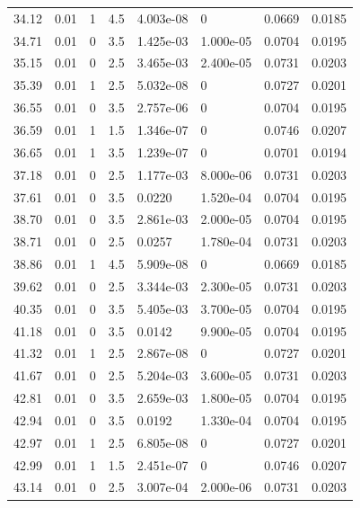 \documentclass[preview]{standalone}
\begin{document}
{{{\begin{tabular}{L{1.2cm}C{1.2cm} C{0.3cm}C{0.5cm} C{1.4cm}C{1.4cm} C{1.4cm}C{1.4cm}}
  34.12  &  0.01  & 1     & 4.5 &  4.003e-08  & 0  & 0.0669 &  0.0185   \\ 
  34.71  &  0.01  & 0     & 3.5 &  1.425e-03  & 1.000e-05  & 0.0704 &  0.0195   \\ 
  35.15  &  0.01  & 0     & 2.5 &  3.465e-03  & 2.400e-05  & 0.0731 &  0.0203   \\ 
  35.39  &  0.01  & 1     & 2.5 &  5.032e-08  & 0  & 0.0727 &  0.0201   \\ 
  36.55  &  0.01  & 0     & 3.5 &  2.757e-06  & 0  & 0.0704 &  0.0195   \\ 
  36.59  &  0.01  & 1     & 1.5 &  1.346e-07  & 0  & 0.0746 &  0.0207   \\ 
  36.65  &  0.01  & 1     & 3.5 &  1.239e-07  & 0  & 0.0701 &  0.0194   \\ 
  37.18  &  0.01  & 0     & 2.5 &  1.177e-03  & 8.000e-06  & 0.0731 &  0.0203   \\ 
  37.61  &  0.01  & 0     & 3.5 &  0.0220  & 1.520e-04  & 0.0704 &  0.0195   \\ 
  38.70  &  0.01  & 0     & 3.5 &  2.861e-03  & 2.000e-05  & 0.0704 &  0.0195   \\ 
  38.71  &  0.01  & 0     & 2.5 &  0.0257  & 1.780e-04  & 0.0731 &  0.0203   \\ 
  38.86  &  0.01  & 1     & 4.5 &  5.909e-08  & 0  & 0.0669 &  0.0185   \\ 
  39.62  &  0.01  & 0     & 2.5 &  3.344e-03  & 2.300e-05  & 0.0731 &  0.0203   \\ 
  40.35  &  0.01  & 0     & 3.5 &  5.405e-03  & 3.700e-05  & 0.0704 &  0.0195   \\ 
  41.18  &  0.01  & 0     & 3.5 &  0.0142  & 9.900e-05  & 0.0704 &  0.0195   \\ 
  41.32  &  0.01  & 1     & 2.5 &  2.867e-08  & 0  & 0.0727 &  0.0201   \\ 
  41.67  &  0.01  & 0     & 2.5 &  5.204e-03  & 3.600e-05  & 0.0731 &  0.0203   \\ 
  42.81  &  0.01  & 0     & 3.5 &  2.659e-03  & 1.800e-05  & 0.0704 &  0.0195   \\ 
  42.94  &  0.01  & 0     & 3.5 &  0.0192  & 1.330e-04  & 0.0704 &  0.0195   \\ 
  42.97  &  0.01  & 1     & 2.5 &  6.805e-08  & 0  & 0.0727 &  0.0201   \\ 
  42.99  &  0.01  & 1     & 1.5 &  2.451e-07  & 0  & 0.0746 &  0.0207   \\ 
  43.14  &  0.01  & 0     & 2.5 &  3.007e-04  & 2.000e-06  & 0.0731 &  0.0203   \\ 

\end{tabular}}}}
\end{document}
